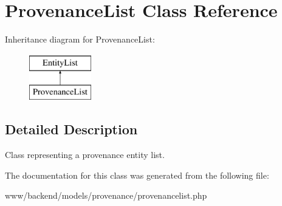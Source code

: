 \hypertarget{classProvenanceList}{
\section{ProvenanceList Class Reference}
\label{classProvenanceList}
}
Inheritance diagram for ProvenanceList:\begin{figure}[H]
\begin{center}
\leavevmode
\includegraphics[height=2.000000cm]{classProvenanceList}
\end{center}
\end{figure}


\subsection{Detailed Description}
Class representing a provenance entity list. 

The documentation for this class was generated from the following file:\begin{DoxyCompactItemize}
\item 
www/backend/models/provenance/provenancelist.php\end{DoxyCompactItemize}
